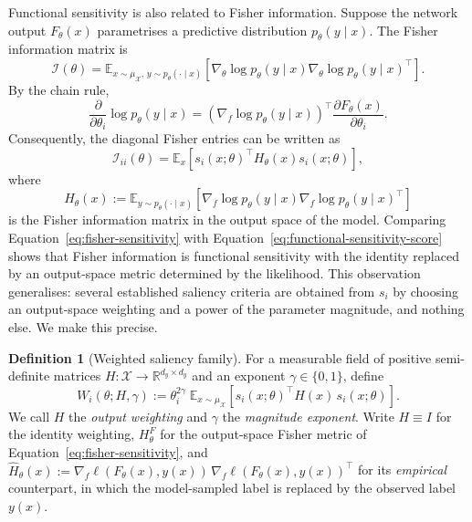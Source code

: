 \documentclass{article}
\theoremstyle{definition}
\newtheorem{definition}[theorem]{Definition}
\theoremstyle{remark}
\begin{document}
Functional sensitivity is also related to Fisher information. Suppose the network output \(F_\theta(x)\) parametrises a predictive distribution \(p_\theta(y\mid x)\). The Fisher information matrix is
\begin{equation}
    \mathcal I(\theta)
    =
    \mathbb E_{x\sim\mu_{\mathcal X},\,y\sim p_\theta(\cdot\mid x)}
    \left[
        \nabla_\theta \log p_\theta(y\mid x)
        \nabla_\theta \log p_\theta(y\mid x)^\top
    \right].
\end{equation}
By the chain rule,
\begin{equation}
    \frac{\partial}{\partial\theta_i}
    \log p_\theta(y\mid x)
    =
    \left(
        \nabla_f \log p_\theta(y\mid x)
    \right)^\top
    \frac{\partial F_\theta(x)}{\partial\theta_i}.
\end{equation}
Consequently, the diagonal Fisher entries can be written as
\begin{equation}
    \mathcal I_{ii}(\theta)
    =
    \mathbb E_x
    \left[
        s_i(x;\theta)^\top
        H_\theta(x)
        s_i(x;\theta)
    \right],
    \label{eq:fisher-sensitivity}
\end{equation}
where
\begin{equation}
    H_\theta(x)
    :=
    \mathbb E_{y\sim p_\theta(\cdot\mid x)}
    \left[
        \nabla_f \log p_\theta(y\mid x)
        \nabla_f \log p_\theta(y\mid x)^\top
    \right]
\end{equation}
is the Fisher information matrix in the output space of the model. Comparing
Equation~\eqref{eq:fisher-sensitivity} with
Equation~\eqref{eq:functional-sensitivity-score} shows that Fisher information
is functional sensitivity with the identity replaced by an output-space metric
determined by the likelihood. This observation generalises: several established
saliency criteria are obtained from $s_i$ by choosing an output-space weighting
and a power of the parameter magnitude, and nothing else. We make this precise.

\begin{definition}[Weighted saliency family]
\label{def:weighted-family}
For a measurable field of positive semi-definite matrices
$H:\mathcal X\to\mathbb R^{d_y\times d_y}$ and an exponent
$\gamma\in\{0,1\}$, define
\begin{equation}
    W_i(\theta;H,\gamma)
    :=
    \theta_i^{2\gamma}\;
    \mathbb E_{x\sim\mu_{\mathcal X}}
    \left[
        s_i(x;\theta)^\top H(x)\, s_i(x;\theta)
    \right].
    \label{eq:weighted-family}
\end{equation}
We call $H$ the \emph{output weighting} and $\gamma$ the \emph{magnitude
exponent}. Write $H\equiv I$ for the identity weighting, $H^{F}_\theta$ for the
output-space Fisher metric of Equation~\eqref{eq:fisher-sensitivity}, and
$\widehat H_\theta(x):=\nabla_f\ell(F_\theta(x),y(x))\,
\nabla_f\ell(F_\theta(x),y(x))^\top$ for its \emph{empirical} counterpart, in
which the model-sampled label is replaced by the observed label $y(x)$.
\end{definition}
\end{document}
